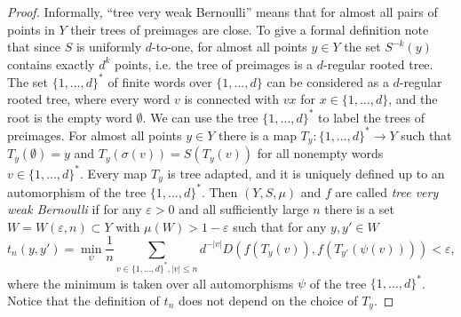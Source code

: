 \documentclass[12pt]{article}
\theoremstyle{definition}
\begin{document}
\begin{proof}
Informally, ``tree very weak Bernoulli'' means that for almost all pairs of points in $Y$ their
trees of preimages are close. To give a formal definition note that since $S$ is uniformly
$d$-to-one, for almost all points $y\in Y$ the set $S^{-k}(y)$ contains exactly $d^k$ points, i.e.
the tree of preimages is a $d$-regular rooted tree. The set $\{1,\ldots, d\}^{*}$ of finite words
over $\{1,\ldots,d\}$ can be considered as a $d$-regular rooted tree, where every word $v$ is
connected with $vx$ for $x\in\{1,\ldots,d\}$, and the root is the empty word $\emptyset$. We can
use the tree $\{1,\ldots, d\}^{*}$ to label the trees of preimages. For almost all points $y\in Y$
there is a map $T_y:\{1,\dots,d\}^*\rightarrow{Y}$ such that $T_y(\emptyset)=y$ and
$T_y(\sigma(v))=S(T_y(v))$ for all nonempty words $v\in \{1,\dots,d\}^*$. Every map $T_y$ is tree
adapted, and it is uniquely defined up to an automorphism of the tree $\{1,\dots,d\}^*$. Then
$(Y,S,\mu)$ and $f$ are called {\it tree very weak Bernoulli} if for any $\varepsilon>0$ and all
sufficiently large $n$ there is a set $W=W(\varepsilon,n)\subset Y$ with $\mu(W)>1-\varepsilon$
such that for any $y,y'\in{W}$
\begin{equation}
\label{} t_n(y,y')=\min_\psi \frac{1}{n}\sum_{v\in \{1,\dots,d\}^{*}, |v|\leq
n}d^{-|v|}D(f(T_y(v)),f(T_{y'}(\psi(v))))<\varepsilon,
\end{equation}
where the minimum is taken over all automorphisms $\psi$ of the tree $\{1,\dots,d\}^*$. Notice that
the definition of $t_n$ does not depend on the choice of $T_y$.


\end{proof}
\end{document}
